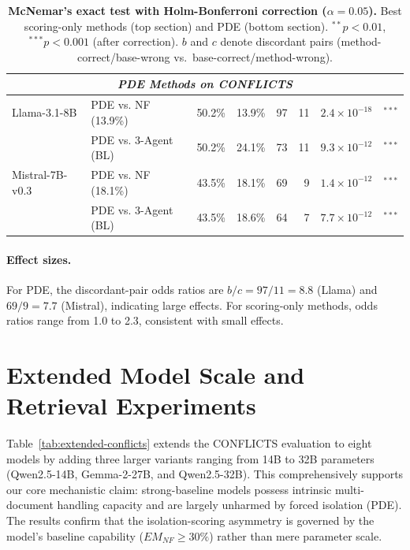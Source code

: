 \documentclass[11pt]{article}
\theoremstyle{definition}
\begin{document}
\begin{table}[htb]
{\begin{tabular}{@{}ll cc rrc c@{}}
\midrule
\multicolumn{8}{c}{\textbf{\textit{PDE Methods on CONFLICTS}}} \\
\midrule
Llama-3.1-8B    & PDE vs. NF (13.9\%) & 50.2\% & 13.9\% & 97 & 11 & \textbf{\(2.4{\times}10^{-18}\)} & \textbf{\(^{***}\)} \\
                & PDE vs. 3-Agent (BL)& 50.2\% & 24.1\% & 73 & 11 & \textbf{\(9.3{\times}10^{-12}\)} & \textbf{\(^{***}\)} \\
\addlinespace[2pt]
Mistral-7B-v0.3 & PDE vs. NF (18.1\%) & 43.5\% & 18.1\% & 69 &  9 & \textbf{\(1.4{\times}10^{-12}\)} & \textbf{\(^{***}\)} \\
                & PDE vs. 3-Agent (BL)& 43.5\% & 18.6\% & 64 &  7 & \textbf{\(7.7{\times}10^{-12}\)} & \textbf{\(^{***}\)} \\
\bottomrule
\end{tabular}
}
\caption{\textbf{McNemar's exact test with Holm-Bonferroni correction (\(\alpha = 0.05\)).}
Best scoring-only methods (top section) and PDE (bottom section). \(^{**}p < 0.01\), \(^{***}p < 0.001\) (after correction). \(b\) and \(c\) denote discordant pairs (method-correct/base-wrong vs.\ base-correct/method-wrong).}
\label{tab:mcnemar-details}
\end{table}



\paragraph{Effect sizes.}
For PDE, the discordant-pair odds ratios are \(b/c = 97/11 = 8.8\) (Llama) and \(69/9 = 7.7\) (Mistral), indicating large effects.
For scoring-only methods, odds ratios range from 1.0 to 2.3, consistent with small effects.


\section{Extended Model Scale and Retrieval Experiments}
\label{sec:appendix-extended-conflicts}

Table~\ref{tab:extended-conflicts} extends the CONFLICTS evaluation to eight models by adding three larger variants ranging from 14B to 32B parameters (Qwen2.5-14B, Gemma-2-27B, and Qwen2.5-32B). This comprehensively supports our core mechanistic claim: strong-baseline models possess intrinsic multi-document handling capacity and are largely unharmed by forced isolation (PDE). The results confirm that the isolation-scoring asymmetry is governed by the model's baseline capability (\(EM_{NF} \ge 30\%\)) rather than mere parameter scale.
\end{document}
